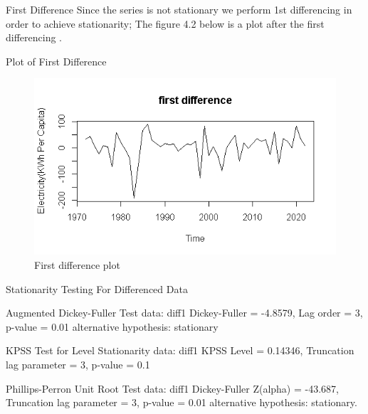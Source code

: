 \documentclass{beamer}
\begin{document}
	\begin{frame}
		\begin{alertblock}{First Difference}
			\vspace{5pt}
			Since the series is not stationary we perform 1st differencing in order to achieve stationarity;
			The figure 4.2 below is a plot after the first differencing .
			\vspace{5pt}
		\end{alertblock}
	\end{frame}

	\begin{frame}{Plot of First Difference}
		\begin{figure}
			\begin{center}
				\includegraphics[width=0.9\linewidth]{images/image2}
			\end{center}
		
			\caption{First difference plot}
		\end{figure}

	\end{frame}

	\begin{frame}{Stationarity Testing For Differenced Data}
		\begin{block}{Augmented Dickey-Fuller Test}
			data: diff1 Dickey-Fuller = -4.8579, Lag order = 3, p-value = 0.01 alternative hypothesis: stationary \vspace{5pt}
		\end{block}
		
		\begin{alertblock}{KPSS Test for Level Stationarity}
			data: diff1 KPSS Level = 0.14346, Truncation lag parameter = 3, p-value = 0.1 \vspace{5pt}
		\end{alertblock}
		
		\begin{exampleblock}{Phillips-Perron Unit Root Test}
			data: diff1 Dickey-Fuller Z(alpha) = -43.687, Truncation lag parameter = 3, p-value = 0.01 alternative hypothesis: stationary.
		\end{exampleblock}
	\end{frame}
\end{document}

